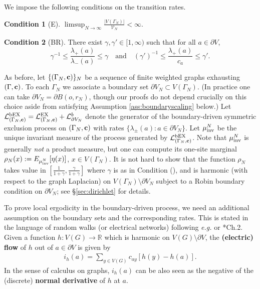 \documentclass[11pt]{amsart}
\theoremstyle{plain}
\theoremstyle{definition}
\newtheorem*{condition}{Condition}
\theoremstyle{remark}
\begin{document}
We impose the following conditions on the transition rates.

\begin{condition}[E] \label{ass:boundedaway}
$\displaystyle \limsup_{N\to\infty} \frac{|V(\Gamma_N)|}{\mathcal{V}_N} < \infty$.
\end{condition}

\begin{condition}[BR] \label{ass:boundaryrate}
There exist $\gamma,\gamma'\in [1,\infty)$ such that for all $a\in \partial V$, 
$$
\gamma^{-1} \leq \frac{\lambda_+(a)}{\lambda_-(a)} \leq \gamma \quad\text{and}\quad (\gamma')^{-1} \leq \frac{\lambda_+(a)}{c_a} \leq \gamma'.
$$
\end{condition}

As before, let $\{(\Gamma_N,{\bf c})\}_N$ be a sequence of finite weighted graphs exhausting $(\Gamma,{\bf c})$. To each $\Gamma_N$ we associate a boundary set $\partial V_N \subset V(\Gamma_N)$. (In practice one can take $\partial V_N = \partial B(o, r_N)$, though our proofs do not depend crucially on this choice aside from satisfying Assumption \ref{ass:boundaryscaling} below.) Let $\mathcal{L}^{\rm bEX}_{(\Gamma_N, {\bf c})} = \mathcal{L}^{\rm EX}_{(\Gamma_N, {\bf c})} + \mathcal{L}^b_{\partial V_N}$ denote the generator of the boundary-driven symmetric exclusion process on $(\Gamma_N, {\bf c})$ with rates $\{\lambda_\pm(a): a\in \partial V_N\}$. Let $\mu^N_{\rm inv}$ be the unique invariant measure of the process generated by $\mathcal{L}^{\rm bEX}_{(\Gamma_N, {\bf c})}$. Note that $\mu^N_{\rm inv}$ is generally \emph{not} a product measure, but one can compute its one-site marginal $\rho_N(x):= E_{\mu_{\rm inv}^N}[\eta(x)]$, $x\in V(\Gamma_N)$. It is not hard to show that the function $\rho_N$ takes value in $\left[\frac{1}{1+\gamma}, \frac{\gamma}{1+\gamma}\right]$ where $\gamma$ is as in Condition (), and is harmonic (with respect to the graph Laplacian) on $V(\Gamma_N) \setminus \partial V_N$ subject to a Robin boundary condition on $\partial V_N$; see \S\ref{sec:dirichlet} for details.

To prove local ergodicity in the boundary-driven process, we need an additional assumption on the boundary sets and the corresponding rates. This is stated in the language of random walks (or electrical networks) following \emph{e.g.\@} \cite{DoyleSnell} or \cite{LyonsPeres}*{Ch.\@ 2}. Given a function $h: V(G)\to\mathbb{R}$ which is harmonic on $V(G)\setminus \partial V$, the \textbf{(electric) flow} of $h$ out of $a\in \partial V$ is given by
\begin{align}
\label{eq:flow}
i_h(a) = \sum_{y\in V(G)} c_{ay}[h(y)-h(a)].
\end{align}
In the sense of calculus on graphs, $i_h(a)$ can be also seen as the negative of the (discrete) \textbf{normal derivative} of $h$ at $a$.
\end{document}
